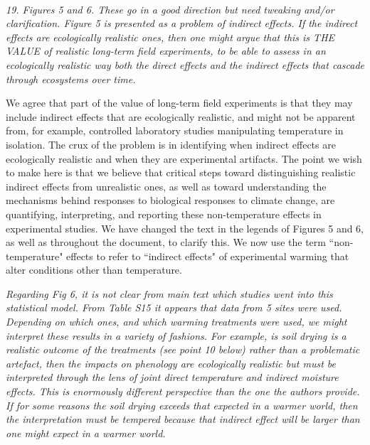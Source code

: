 \documentclass[11pt,a4paper]{letter}
\begin{document}
\\
\par \emph{19. Figures 5 and 6. These go in a good direction but need tweaking and/or clarification. Figure 5 is presented as a
problem of indirect effects. If the indirect effects are ecologically realistic ones, then one might
argue that this is THE VALUE of realistic long-term field experiments, to be able to assess in an
ecologically realistic way both the direct effects and the indirect effects that cascade through
ecosystems over time.}

We agree that part of the value of long-term field experiments is that they may include indirect effects that are ecologically realistic, and might not be apparent from, for example, controlled laboratory studies manipulating temperature in isolation. The crux of the problem is in identifying when indirect effects are ecologically realistic and when they are experimental artifacts. The point we wish to make here is that we believe that critical steps toward distinguishing realistic indirect effects from unrealistic ones, as well as toward understanding the mechanisms behind responses to biological responses to climate change, are quantifying, interpreting, and reporting these non-temperature effects in experimental studies. We have changed the text in the legends of Figures 5 and 6, as well as throughout the document, to clarify this. We now use the term ``non-temperature" effects to refer to ``indirect effects" of experimental warming that alter conditions other than temperature. 
\\
\par \emph{Regarding Fig 6, it is not clear from main text which studies went into this statistical model. From Table S15 it appears that data from 5 sites were used. Depending on which ones, and which warming treatments were used, we might interpret these results in a variety of fashions. For example, is soil drying is a realistic outcome of the treatments (see point 10 below) rather than a problematic artefact, then the impacts on phenology are ecologically realistic but must be interpreted through the lens of joint direct temperature and indirect moisture effects. This is enormously different perspective than the one the authors provide. If for some reasons the soil drying exceeds that expected in a warmer world, then the interpretation must be tempered because that indirect effect will be larger than one might expect in a warmer world.}
\end{document}
